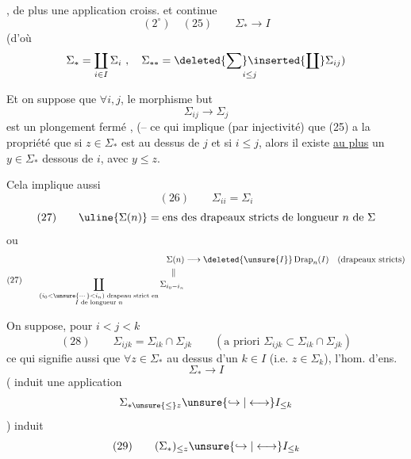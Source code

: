,  de plus une application croiss. et continue
\[
(2^\circ)\quad (25)\qquad \Sigma_*\longrightarrow I
\]
(d'où
\[
\Sigma_*=\coprod_{i\in I}\Sigma_i\ ,\quad
\Sigma_{**}=\underset{i\leq j}{\deleted{\sum}\inserted{\coprod}}\Sigma_{ij})
\]

Et on  suppose que $\forall i,j$,  le morphisme but
\[
\Sigma_{ij}\longrightarrow\Sigma_j
\]
est un  plongement fermé , (-- ce qui implique (par injectivité) que (25\unsure{$^*$|$^\circ$}) a la propriété que si $z\in\Sigma_*$ est au dessus de $j$ et si $i\leq j$, alors il existe \uline{au plus} un $y\in\Sigma_*$  dessous de $i$, avec $y\leq z$.

Cela implique aussi
\[
(26)\qquad\Sigma_{ii}=\Sigma_i
\]
\[
(27)\qquad \uline{\Sigma(n)}=\text{ens des drapeaux stricts de longueur }n\text{ de }\Sigma
\]
ou
\[
(27)\qquad
\begin{aligned}
\Sigma(n)&\longrightarrow\deleted{\unsure{I}}\operatorname{Drap}_n(I)\quad\text{(drapeaux stricts)}\\
\Vert\quad&\\[-1ex]
\coprod_{\substack{(i_0<\unsure{\cdots}<i_n)\text{ drapeau strict en}\\ I\text{ de longueur }n}}\Sigma_{i_0- i_n}&
\end{aligned}
\]

On suppose, pour $i<j<k$
\[
(28)\qquad\Sigma_{ijk}=\Sigma_{ik}\cap\Sigma_{jk}\qquad
(\text{a priori }\Sigma_{ijk}\subset\Sigma_{ik}\cap\Sigma_{jk})
\]
ce qui signifie aussi que $\forall z\in\Sigma_*$ au dessus d'un $k\in I$ (i.e. $z\in\Sigma_k$), l'hom. d'ens.
\[
\Sigma_*\longrightarrow I
\]
( induit une application
\[
\Sigma_{*\unsure{\leq}z}\unsure{\hookrightarrow|\longleftrightarrow} I_{\leq k}
\]
) induit
\[
(29)\qquad (\Sigma_*)_{\leq z}\unsure{\hookrightarrow|\longleftrightarrow} I_{\leq k}
\]

